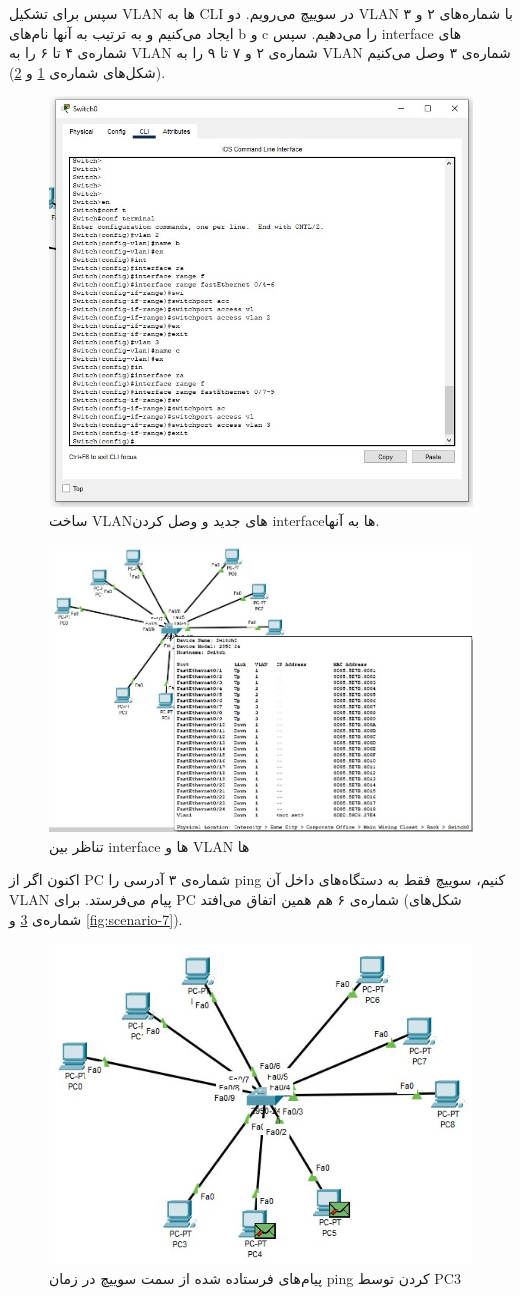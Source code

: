 \documentclass{article}
\begin{document}
سپس برای تشکیل VLAN ها به CLI در سوییچ می‌رویم. دو VLAN  با شماره‌‌های ۲ و ۳ ایجاد می‌کنیم و به ترتیب به آنها نام‌های b و c را می‌دهیم. سپس interface‌ های شماره‌ی ۴ تا ۶ را به VLAN شماره‌ی ۲ و ۷ تا ۹ را به VLAN شماره‌ی ۳ وصل می‌کنیم (شکل‌های شماره‌ی \ref{fig:scenario-4} و \ref{fig:scenario-5}).

\begin{figure}[h!]
	\centering
	\includegraphics[width=0.6\columnwidth]{4.jpg}
	\caption{ساخت VLANهای جدید و وصل کردن interfaceها به آنها.}
	\label{fig:scenario-4}
\end{figure}

\begin{figure}[h!]
	\centering
	\includegraphics[width=0.6\columnwidth]{7.jpg}
	\caption{تناظر بین interface ها و VLAN ها}
	\label{fig:scenario-5}
\end{figure}

اکنون اگر از PC شماره‌ی ۳ آدرسی را ping کنیم، سوییچ فقط به دستگاه‌های داخل آن VLAN پیام می‌فرستد. برای PC شماره‌ی ۶ هم همین اتفاق می‌افتد (شکل‌‌های شماره‌ی \ref{fig:scenario-6} و \ref{fig:scenario-7}).

\begin{figure}[h!]
	\centering
	\includegraphics[width=0.6\columnwidth]{5.jpg}
	\caption{پیام‌های فرستاده شده از سمت سوییچ در زمان ping کردن توسط PC3}
	\label{fig:scenario-6}
\end{figure}
\end{document}
